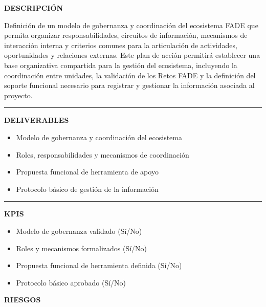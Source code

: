 \documentclass[11pt,a4paper]{scrreprt}
\newcommand{\fieldlabel}[1]{%
  {\footnotesize\sffamily\bfseries\color{mutedcolor}\MakeUppercase{#1}}\par\nopagebreak[4]
}
\newcommand{\fieldsep}{\vspace{3pt}\noindent\textcolor{bordercolor}{\rule{\linewidth}{0.4pt}}\vspace{3pt}\par}
\begin{document}
\begin{tcolorbox}[pabox={filcolor}{PA1.3 \enspace\textbullet\enspace Definición del modelo de gobernanza y coordinación del ecosistema FADE}]

\fieldlabel{Descripci\'on}
{\small Definición de un modelo de gobernanza y coordinación del ecosistema FADE que permita organizar responsabilidades, circuitos de información, mecanismos de interacción interna y criterios comunes para la articulación de actividades, oportunidades y relaciones externas. Este plan de acción permitirá establecer una base organizativa compartida para la gestión del ecosistema, incluyendo la coordinación entre unidades, la validación de los Retos FADE y la definición del soporte funcional necesario para registrar y gestionar la información asociada al proyecto. }\par
\fieldsep
\fieldlabel{Deliverables}
{\small \begin{itemize}[noitemsep,topsep=2pt]
\item Modelo de gobernanza y coordinación del ecosistema
\item Roles, responsabilidades y mecanismos de coordinación
\item Propuesta funcional de herramienta de apoyo
\item Protocolo básico de gestión de la información
\end{itemize}}\par
\fieldsep
\fieldlabel{KPIs}
{\small \begin{itemize}[noitemsep,topsep=2pt]
\item Modelo de gobernanza validado (Sí/No)
\item Roles y mecanismos formalizados (Sí/No)
\item Propuesta funcional de herramienta definida (Sí/No)
\item Protocolo básico aprobado (Sí/No)
\end{itemize}}\par
\end{tcolorbox}
\begin{tcolorbox}[riskbox]
{\footnotesize\sffamily\bfseries\color{red!50!black} RIESGOS}\par{}
\end{tcolorbox}
\end{document}
